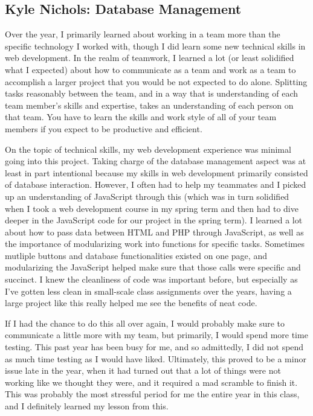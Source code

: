 \documentclass[../final.tex]{subfiles}
\begin{document}
\subsection{Kyle Nichols: Database Management}
Over the year, I primarily learned about working in a team more than the specific technology I worked with, though I did learn some new technical skills in web development.
In the realm of teamwork, I learned a lot (or least solidified what I expected) about how to communicate as a team and work as a team to accomplish a larger project that you would be not expected to do alone.
Splitting tasks reasonably between the team, and in a way that is understanding of each team member's skills and expertise, takes an understanding of each person on that team.
You have to learn the skills and work style of all of your team members if you expect to be productive and efficient.

On the topic of technical skills, my web development experience was minimal going into this project.
Taking charge of the database management aspect was at least in part intentional because my skills in web development primarily consisted of database interaction.
However, I often had to help my teammates and I picked up an understanding of JavaScript through this (which was in turn solidified when I took a web development course in my spring term and then had to dive deeper in the JavaScript code for our project in the spring term).
I learned a lot about how to pass data between HTML and PHP through JavaScript, as well as the importance of modularizing work into functions for specific tasks.
Sometimes mutliple buttons and database functionalities existed on one page, and modularizing the JavaScript helped make sure that those calls were specific and succinct.
I knew the cleanliness of code was important before, but especially as I've gotten less clean in small-scale class assignments over the years, having a large project like this really helped me see the benefits of neat code.

If I had the chance to do this all over again, I would probably make sure to communicate a little more with my team, but primarily, I would spend more time testing.
This past year has been busy for me, and so admittedly, I did not spend as much time testing as I would have liked.
Ultimately, this proved to be a minor issue late in the year, when it had turned out that a lot of things were not working like we thought they were, and it required a mad scramble to finish it.
This was probably the most stressful period for me the entire year in this class, and I definitely learned my lesson from this.
\end{document}
